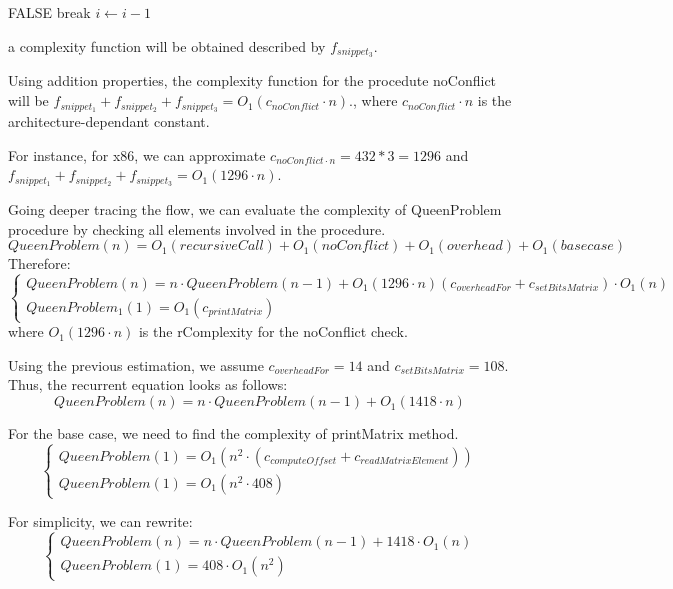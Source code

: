 \begin{algorithmic}[1]
			\State \Return FALSE
		\EndIf
		\State break
	\EndIf
	\State $i \gets i-1$	
	\EndFor
\end{algorithmic}
a complexity function will be obtained described by $f_{snippet_{3}}$.

Using addition properties, the complexity function for the procedute noConflict will be $f_{snippet_{1}} + f_{snippet_{2}} + f_{snippet_{3}} = O_{1}(c_{noConflict} \cdot n)$., where $c_{noConflict} \cdot n$ is the architecture-dependant constant.

 For instance, for x86, we can approximate $c_{noConflict \cdot n} = 432 * 3 = 1296$ and $f_{snippet_{1}} + f_{snippet_{2}} + f_{snippet_{3}} = O_{1}(1296 \cdot n) $.



Going deeper tracing the flow, we can evaluate the complexity of QueenProblem procedure by checking all elements involved in the procedure.
 \[QueenProblem(n) = O_{1}(recursiveCall) + O_{1}(noConflict) + O_{1}(overhead) + O_{1}(basecase) \]
Therefore:
 \[\begin{cases} QueenProblem(n) = n \cdot QueenProblem(n-1) +  O_{1}(1296 \cdot n) (c_{overheadFor} + c_{setBitsMatrix}) \cdot O_{1}(n) \\ QueenProblem_{1}(1)=O_{1}(c_{printMatrix}) \end{cases}\]
 where $O_{1}(1296 \cdot n)$ is the rComplexity for the noConflict check.
 
Using the previous estimation, we assume $c_{overheadFor} = 14$ and $c_{setBitsMatrix} = 108$. Thus, the recurrent equation looks as follows: 
\[QueenProblem(n) = n \cdot QueenProblem(n-1) +  O_{1}(1418 \cdot n) \]

For the base case, we need to find the complexity of printMatrix method.
\[ \begin{cases} QueenProblem(1)=O_{1}(n^{2} \cdot  (c_{computeOffset} + c_{readMatrixElement})) \\ QueenProblem(1)=O_{1}(n^{2} \cdot  408) \end{cases}\]

For simplicity, we can rewrite:
\[ \begin{cases} QueenProblem(n) = n \cdot QueenProblem(n-1) +  1418 \cdot O_{1}(n) \\ QueenProblem(1)= 408 \cdot O_{1}(n^{2}) \end{cases}\]

